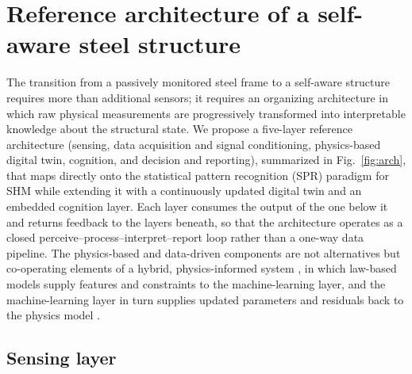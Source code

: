 \section{Reference architecture of a self-aware steel structure}\label{sec:architecture}

The transition from a passively monitored steel frame to a self-aware structure requires more than additional sensors; it requires an organizing architecture in which raw physical measurements are progressively transformed into interpretable knowledge about the structural state. We propose a five-layer reference architecture (sensing, data acquisition and signal conditioning, physics-based digital twin, cognition, and decision and reporting), summarized in Fig.~\ref{fig:arch}, that maps directly onto the statistical pattern recognition (SPR) paradigm for SHM \citep{farrar2013shm} while extending it with a continuously updated digital twin and an embedded cognition layer. Each layer consumes the output of the one below it and returns feedback to the layers beneath, so that the architecture operates as a closed perceive--process--interpret--report loop rather than a one-way data pipeline. The physics-based and data-driven components are not alternatives but co-operating elements of a hybrid, physics-informed system \citep{brunton2019data}, in which law-based models supply features and constraints to the machine-learning layer, and the machine-learning layer in turn supplies updated parameters and residuals back to the physics model \citep{chiachio2022structural,zou2026deep}.

\subsection{Sensing layer}\label{subsec:sensing}

